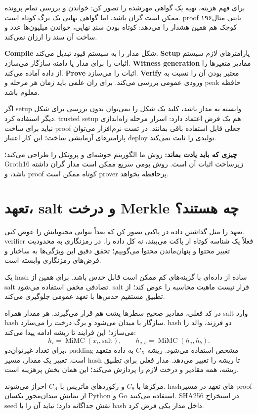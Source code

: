 \documentclass[11pt,a4paper]{article}
\newcommand{\lesson}[1]{\clearpage\section{#1}}
\newcommand{\takeaway}[1]{\par\textbf{چیزی که باید یادت بماند:} #1\par}
\begin{document}
برای فهم هزینه، تهیه یک گواهی مهرشده را تصور کن: خواندن و بررسی تمام پرونده ممکن است گران باشد، اما گواهی نهایی یک برگ کوتاه است. proof ۱۹۶بایتی مثال کوچک هم همین هشدار را می‌دهد: کوتاه بودن سندِ نهایی، خواندن میلیون‌ها عدد و ساخت آن سند را ارزان نمی‌کند.

\textbf{Compile} شکل مدار را به سیستم قیود تبدیل می‌کند. \textbf{Setup} پارامترهای لازم سیستم اثبات را برای مدار یا دامنه سازگار می‌سازد. \textbf{Witness generation} مقادیر متغیرها را از داده آماده می‌کند. \textbf{Prove} اثبات را می‌سازد. \textbf{Verify} معتبر بودن آن را نسبت به ورودی عمومی بررسی می‌کند. برای ران علمی باید زمان هر مرحله و peak حافظه معلوم باشد.

اگر setup وابسته به مدار باشد، کلید یک شکل را نمی‌توان بدون بررسی برای شکل دیگر استفاده کرد. trusted setup هم یک فرض اعتماد دارد: اسرار مرحله راه‌اندازی نباید برای ساخت proof جعلی قابل استفاده باقی بمانند. در تست نرم‌افزار می‌توان پارامترهای آزمایشی ساخت؛ این کار اعتبار deploy تولیدی را ثابت نمی‌کند.

\takeaway{روش ما الگوریتم خوشه‌ای و پروتکل را طراحی می‌کند؛ Groth16 زیرساخت اثبات آن است. روش بومی سریع ممکن است مدار گران داشته باشد، و proof کوتاه ممکن است prover پرحافظه بخواهد.}

\lesson{تعهد، salt و درخت Merkle چه هستند؟}
تعهد را مثل گذاشتن داده در پاکتی تصور کن که بعداً نتوانی محتویاتش را عوض کنی. verifier فعلاً یک شناسه کوتاه از پاکت می‌بیند، نه کل داده را. در رمزنگاری به محدودیت تغییر محتوا  و پنهان‌ماندن محتوا  می‌گوییم؛ تحقق دقیق این ویژگی‌ها به ساختار و فرض‌های رمزنگاری وابسته است.

یک hash ساده از داده‌ای با گزینه‌های کم ممکن است قابل حدس باشد. برای همین از salt تصادفی مخفی استفاده می‌شود. salt قرار نیست ماهیت محاسبه را عوض کند؛ از تطبیق مستقیم حدس‌ها با تعهد عمومی جلوگیری می‌کند.

در کد فعلی، مقادیر صحیح سطرها پشت هم قرار می‌گیرند. هر مقدار همراه salt وارد hash سازگار با میدان می‌شود و برگ درخت را می‌سازد. hash دو فرزند، والد را می‌سازد؛ این فرایند تا ریشه ادامه پیدا می‌کند:
\[
 h_i=\operatorname{MiMC}(x_i,\mathrm{salt}),\qquad
 h_{a,b}=\operatorname{MiMC}(h_a,h_b).
\]
برای تعداد غیرتوان‌دو، padding مشخص استفاده می‌شود. ریشه \(C_X\) به داده متعهد است. تغییر یک مقدار، مسیر hash تا ریشه را تغییر می‌دهد. مدار فعلی برای تطبیق ریشه، همه مقادیر و درخت لازم را پردازش می‌کند؛ این همان بخش پرهزینه است.

مرکزها با \(C_\theta\) و رکوردهای ماتریس با \(C_A\) احراز می‌شوند. hashهای تعهد در مسیر proof از نمایش میدان‌محور یکسان Python و Go استفاده می‌کنند. SHA256 در استخراج seed نقش جداگانه دارد؛ نباید آن را با hash داخل مدار یکی فرض کرد.
\end{document}
